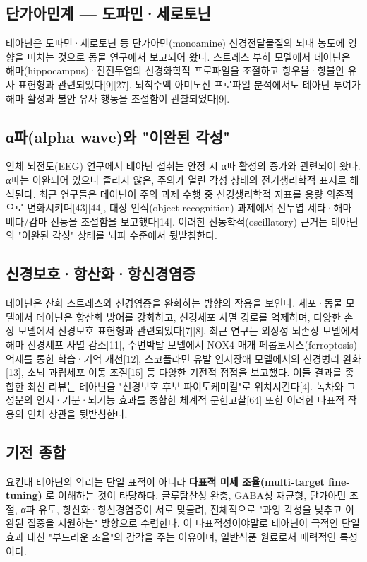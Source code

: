 \documentclass[11pt,oneside]{book}
\begin{document}
\subsection{단가아민계 — 도파민·세로토닌}
테아닌은 도파민·세로토닌 등 단가아민(monoamine) 신경전달물질의 뇌내 농도에 영향을 미치는 것으로 동물 연구에서 보고되어 왔다. 스트레스 부하 모델에서 테아닌은 해마(hippocampus)·전전두엽의 신경화학적 프로파일을 조절하고 항우울·항불안 유사 표현형과 관련되었다[9][27]. 뇌척수액 아미노산 프로파일 분석에서도 테아닌 투여가 해마 활성과 불안 유사 행동을 조절함이 관찰되었다[9].

\subsection{α파(alpha wave)와 "이완된 각성"}
인체 뇌전도(EEG) 연구에서 테아닌 섭취는 안정 시 α파 활성의 증가와 관련되어 왔다. α파는 이완되어 있으나 졸리지 않은, 주의가 열린 각성 상태의 전기생리학적 표지로 해석된다. 최근 연구들은 테아닌이 주의 과제 수행 중 신경생리학적 지표를 용량 의존적으로 변화시키며[43][44], 대상 인식(object recognition) 과제에서 전두엽 세타·해마 베타/감마 진동을 조절함을 보고했다[14]. 이러한 진동학적(oscillatory) 근거는 테아닌의 "이완된 각성" 상태를 뇌파 수준에서 뒷받침한다.

\subsection{신경보호·항산화·항신경염증}
테아닌은 산화 스트레스와 신경염증을 완화하는 방향의 작용을 보인다. 세포·동물 모델에서 테아닌은 항산화 방어를 강화하고, 신경세포 사멸 경로를 억제하며, 다양한 손상 모델에서 신경보호 표현형과 관련되었다[7][8]. 최근 연구는 외상성 뇌손상 모델에서 해마 신경세포 사멸 감소[11], 수면박탈 모델에서 NOX4 매개 페롭토시스(ferroptosis) 억제를 통한 학습·기억 개선[12], 스코폴라민 유발 인지장애 모델에서의 신경병리 완화[13], 소뇌 과립세포 이동 조절[15] 등 다양한 기전적 접점을 보고했다. 이들 결과를 종합한 최신 리뷰는 테아닌을 "신경보호 후보 파이토케미컬"로 위치시킨다[4]. 녹차와 그 성분의 인지·기분·뇌기능 효과를 종합한 체계적 문헌고찰[64] 또한 이러한 다표적 작용의 인체 상관을 뒷받침한다.

\subsection{기전 종합}
요컨대 테아닌의 약리는 단일 표적이 아니라 \textbf{다표적 미세 조율(multi-target fine-tuning)} 로 이해하는 것이 타당하다. 글루탐산성 완충, GABA성 재균형, 단가아민 조절, α파 유도, 항산화·항신경염증이 서로 맞물려, 전체적으로 "과잉 각성을 낮추고 이완된 집중을 지원하는" 방향으로 수렴한다. 이 다표적성이야말로 테아닌이 극적인 단일 효과 대신 "부드러운 조율"의 감각을 주는 이유이며, 일반식품 원료로서 매력적인 특성이다.
\end{document}
